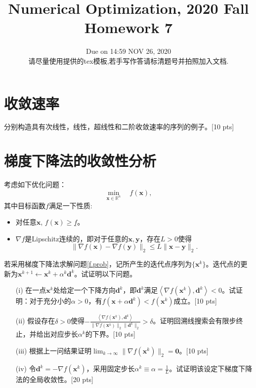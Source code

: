\documentclass[10pt]{article}
\begin{document}
	
\title{	Numerical Optimization, 2020 Fall\\Homework 7}
\date{Due on 14:59 NOV 26, 2020\\
	请尽量使用提供的tex模板,若手写作答请标清题号并拍照加入文档.
	}
\maketitle

\section{收敛速率}
分别构造具有次线性，线性，超线性和二阶收敛速率的序列的例子。{\color{red}[10 pts]}

\section{梯度下降法的收敛性分析}
考虑如下优化问题：
\begin{equation}\label{f.prob}
	\min_{\bm{x}\in \mathbb{R}^n} \quad f(\bm{x}),
\end{equation}
其中目标函数$f$满足一下性质:
\begin{itemize}
	\item 对任意$\bm{x}$, $f(\bm{x})\ge \underline{f}$。
	\item $\nabla f$是Lipschitz连续的，即对于任意的$\bm{x}, \bm{y}$，存在$L>0$使得
	$$
	\|\nabla f(\bm{x}) - \nabla f(\bm{y})\|_2 \le L \|\bm{x}- \bm{y}\|_2.
	$$	
\end{itemize}
若采用梯度下降法求解问题\eqref{f.prob}，记所产生的迭代点序列为$\{\bm{x}^k\}$。迭代点的更新为$\bm{x}^{k+1} \leftarrow \bm{x}^k + \alpha^k\bm{d}^k$。试证明以下问题。
\begin{enumerate}
	\item[(i)] 在一点$\bm{x}^k$处给定一个下降方向$\bm{d}^k$，即$\bm{d}^k$满足$\left \langle \nabla f(\bm{x}^k), \bm{d}^k \right \rangle <0$。试证明：对于充分小的$\alpha>0$，有$f(\bm{x}+\alpha\bm{d}^k)<f(\bm{x}^k)$成立。{\color{red}[10 pts]}
	\item[(ii)] 假设存在$\delta>0$使得$-\frac{\left \langle \nabla f(\bm{x}^k), \bm{d}^k \right \rangle}{\|\nabla f(\bm{x}^k)\|_2\|\bm{d}^k\|_2}>\delta$。证明回溯线搜索会有限步终止，并给出对应步长$\alpha^k$的下界。{\color{red}[10 pts]}
	\item[(iii)] 根据上一问结果证明$\lim_{k\to\infty}\|\nabla f(\bm{x}^k)\|_2= \bm{0}$。{\color{red}[10 pts]}
	\item[(iv)] 令$\bm{d}^k=-\nabla f(\bm{x}^k)$，采用固定步长$\alpha^k\equiv \alpha = \frac{1}{L}$。试证明该设定下梯度下降法的全局收敛性。{\color{red}[20 pts]}
\end{enumerate}
\end{document}
